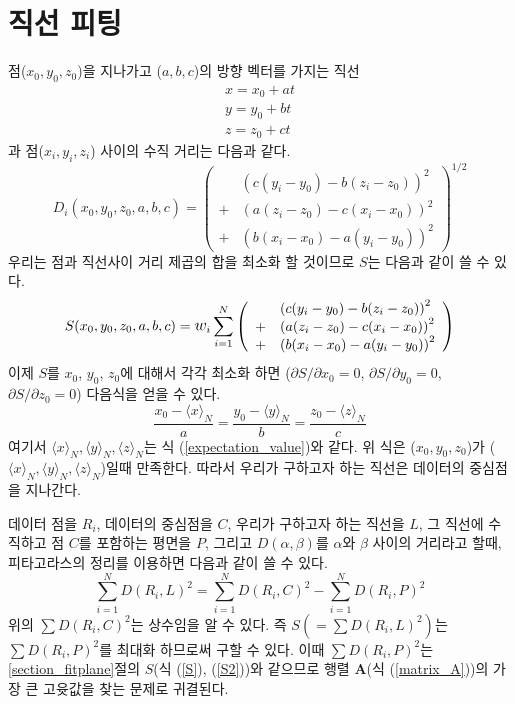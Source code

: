 \documentclass[chapter,a4paper,10pt]{oblivoir}
\begin{document}
\section{직선 피팅}
점($x_0, y_0, z_0$)을 지나가고 ($a,b,c$)의 방향 벡터를 가지는 직선
\begin{equation}
\left.
\begin{array}{ll}
x = x_0 + at \\\nonumber
y = y_0 + bt \\\nonumber
z = z_0 + ct
\end{array}\right.
\end{equation}
과 점($x_i, y_i, z_i$) 사이의 수직 거리는 다음과 같다.
\begin{equation}
D_i(x_0,y_0,z_0,a,b,c) = \left( 
\begin{array}{ll}
  &\left(c(y_i-y_0) - b(z_i - z_0)\right)^2 \\
  + &\left(a(z_i-z_0) - c(x_i - x_0)\right)^2 \\
  + &\left(b(x_i-x_0) - a(y_i - y_0)\right)^2 
\end{array} \right)^{1/2}
\end{equation}
우리는 점과 직선사이 거리 제곱의 합을 최소화 할 것이므로 $S$는 다음과 같이 쓸 수 있다.
\begin{equation}
S(x_0,y_0,z_0,a,b,c) = \mathlarger w_i \sum_{i=1}^N\left( 
\begin{array}{ll}
  &\left(c(y_i-y_0) - b(z_i - z_0)\right)^2 \\
  + &\left(a(z_i-z_0) - c(x_i - x_0)\right)^2 \\
  + &\left(b(x_i-x_0) - a(y_i - y_0)\right)^2 
\end{array} \right)
\end{equation}
이제 $S$를 $x_0$, $y_0$, $z_0$에 대해서 각각 최소화 하면
(${\partial S}/{\partial x_0}=0$, ${\partial S}/{\partial y_0}=0$, ${\partial S}/{\partial z_0}=0$)
다음식을 얻을 수 있다.
\begin{equation}
\frac{x_0-\langle x \rangle_N}{a} = \frac{y_0-\langle y \rangle_N}{b} = \frac{z_0-\langle z \rangle_N}{c}
\end{equation}
여기서 $\langle x \rangle_N , \langle y \rangle_N, \langle z \rangle_N$는 식 (\ref{expectation_value})와 같다.
위 식은 ($x_0,y_0,z_0$)가 ($\langle x \rangle_N,\langle y \rangle_N,\langle z \rangle_N$)일때 만족한다. 
따라서 우리가 구하고자 하는 직선은 데이터의 중심점을 지나간다.

데이터 점을 $R_i$, 데이터의 중심점을 $C$, 우리가 구하고자 하는 직선을 $L$, 
그 직선에 수직하고 점 $C$를 포함하는 평면을 $P$, 그리고 
$D(\alpha, \beta)$를 $\alpha$와 $\beta$ 사이의 거리라고 할때, 
피타고라스의 정리를 이용하면 다음과 같이 쓸 수 있다.
\begin{equation}
\sum_{i=1}^N D(R_i, L)^2 = \sum_{i=1}^N D(R_i, C)^2 - \sum_{i=1}^N D(R_i, P)^2
\end{equation}
위의 $\sum D(R_i, C)^2$는 상수임을 알 수 있다.
즉 $S(=\sum D(R_i, L)^2)$는 
$\sum D(R_i, P)^2$를 최대화 하므로써 구할 수 있다.
이때 $\sum D(R_i, P)^2$는 \ref{section_fitplane}절의 $S$(식 (\ref{S}), (\ref{S2}))와 같으므로
행렬 $\mathbf{A}$(식 (\ref{matrix_A}))의 가장 큰 고윳값을 찾는 문제로 귀결된다.
\end{document}
